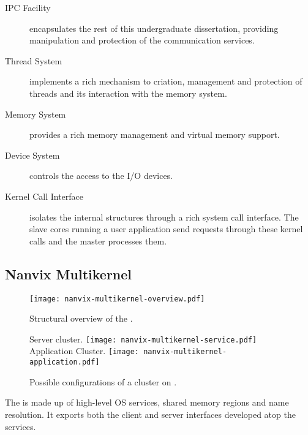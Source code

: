 		\begin{description}

			\item[IPC Facility]
				encapsulates the rest of this undergraduate dissertation, providing
				manipulation and protection of the communication services.
				
			\item[Thread System]
				implements a rich mechanism to criation, management and protection of threads
				and its interaction with the memory system.
				
			\item[Memory System] provides a rich memory management and virtual memory support.

			\item[Device System]
				controls the access to the I/O devices.

			\item[Kernel Call Interface]
				isolates the \microkernel internal structures through a rich system call interface.
				The slave cores running a user application send requests through these
				kernel calls and the master processes them.

		\end{description}

	\subsection{Nanvix Multikernel}
	\label{sec.multikernel}

		\begin{figure}[!tb]
			\centering%
			\caption{Structural overview of the \multikernel.}%
			\label{fig:multikernel-overview}%
			\texttt{[image: nanvix-multikernel-overview.pdf]}%
		\end{figure}

		\begin{figure}[!tb]
			\centering%
			\caption{Possible configurations of a cluster on \multikernel.}%
			\label{fig:uma}%

				{Server cluster.}%
				{\texttt{[image: nanvix-multikernel-service.pdf]}}%
			\hspace{1.5cm}%
				{Application Cluster.}%
				{\texttt{[image: nanvix-multikernel-application.pdf]}}%

		\end{figure}


		The \multikernel is made up of high-level OS services, \eg shared memory
		regions and name resolution.
		It exports both the client and server interfaces developed atop	the \microkernel services.